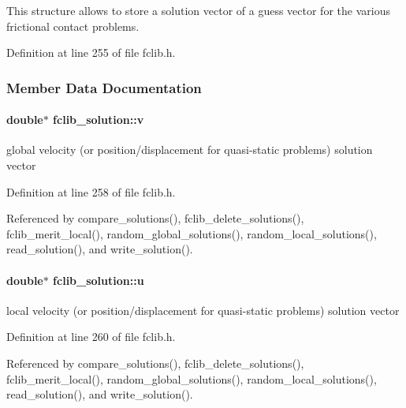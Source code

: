This structure allows to store a solution vector of a guess vector for the various frictional contact problems. 

Definition at line 255 of file fclib.\+h.



\subsubsection{Member Data Documentation}
\hypertarget{structfclib__solution_a252982ce524686a094223a55c194fea8}{}
\paragraph[{v}]{\setlength{\rightskip}{0pt plus 5cm}double$\ast$ fclib\+\_\+solution\+::v}\label{structfclib__solution_a252982ce524686a094223a55c194fea8}


global velocity (or position/displacement for quasi-\/static problems) solution vector 



Definition at line 258 of file fclib.\+h.



Referenced by compare\+\_\+solutions(), fclib\+\_\+delete\+\_\+solutions(), fclib\+\_\+merit\+\_\+local(), random\+\_\+global\+\_\+solutions(), random\+\_\+local\+\_\+solutions(), read\+\_\+solution(), and write\+\_\+solution().

\hypertarget{structfclib__solution_acb160f0dad04b9420388464d256ae41f}{}
\paragraph[{u}]{\setlength{\rightskip}{0pt plus 5cm}double$\ast$ fclib\+\_\+solution\+::u}\label{structfclib__solution_acb160f0dad04b9420388464d256ae41f}


local velocity (or position/displacement for quasi-\/static problems) solution vector 



Definition at line 260 of file fclib.\+h.



Referenced by compare\+\_\+solutions(), fclib\+\_\+delete\+\_\+solutions(), fclib\+\_\+merit\+\_\+local(), random\+\_\+global\+\_\+solutions(), random\+\_\+local\+\_\+solutions(), read\+\_\+solution(), and write\+\_\+solution().

